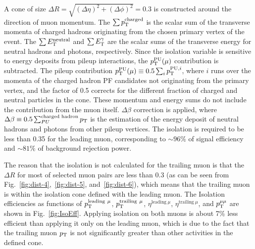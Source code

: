 		A cone of size $\Delta R = \sqrt{(\Delta \eta)^2 +(\Delta \phi)^2} = 0.3$ is constructed around the direction of muon momentum. The $\sum p_{\mathrm{T}}^{\text{charged}}$ is the scalar sum of the transverse momenta of charged hadrons originating from the chosen primary vertex of the event. The $\sum E_{\mathrm{T}}^{\text{neutral}}$ and $\sum E_{\mathrm{T}}^{\gamma} $ are the scalar sums of the transverse energy for neutral hadrons and photons, respectively. Since the isolation variable is sensitive to energy deposits from pileup interactions, the $p_{\mathrm{T}}^{\text{PU}}(\mu)$ contribution is subtracted. The pileup contribution $p_{\mathrm{T}}^{\text{PU}}(\mu) \equiv 0.5 \sum_{i} p_{\mathrm{T}}^{\text{PU}, i}$, where $i$ runs over the momenta of the charged hadron PF candidates not originating from the primary vertex, and the factor of 0.5 corrects for the different fraction of charged and neutral particles in the cone. 
		These momentum and energy sums do not include the contribution from the muon itself. $\Delta\beta$ correction is applied, where $\Delta\beta \equiv 0.5 \sum^{\text{charged\ hadron}}_{PU} p_{\mathrm{T}}$ is the estimation of the energy deposit of neutral hadrons and photons from other pileup vertices. The isolation is required to be less than 0.35 for the leading muon, corresponding to $\sim 96\%$ of signal efficiency and $\sim 81\%$ of background rejection power. 
		
		The reason that the isolation is not calculated for the trailing muon is that the $\Delta R$ for most of selected muon pairs are less than 0.3 (as can be seen from Fig.~\ref{fig:dist-4},~\ref{fig:dist-5}, and~\ref{fig:dist-6}), which means that the trailing muon is within the isolation cone defined with the leading muon.  
		The Isolation efficiencies as functions of $p_{\mathrm{T}}^{\text{leading}\ \mu}$, $p_{\mathrm{T}}^{\text{trailing}\ \mu}$, $\eta^{\text{leading}\ \mu}$, $\eta^{\text{trailing}\ \mu}$, and $p_{\mathrm{T}}^{\mu\mu}$ are shown in Fig.~\ref{fig:IsoEff}. Applying isolation on both muons is about 7\% less efficient than applying it only on the leading muon, which is due to the fact that the trailing muon $p_{\mathrm{T}}$ is not significantly greater than other activities in the defined cone.	 
		
